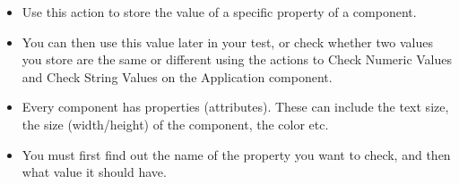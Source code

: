 
\begin{itemize}
\item Use this action to store the value of a specific property of a component.
\item You can then use this value later in your test, or check whether two values you store are the same or different using the actions to Check Numeric Values and Check String Values on the Application component. 
\item Every component has properties (attributes). These can include the text size, the size (width/height) of the component, the color etc.
\item You must first find out the name of the property you want to check, and then what value it should have. 
\end{itemize}
